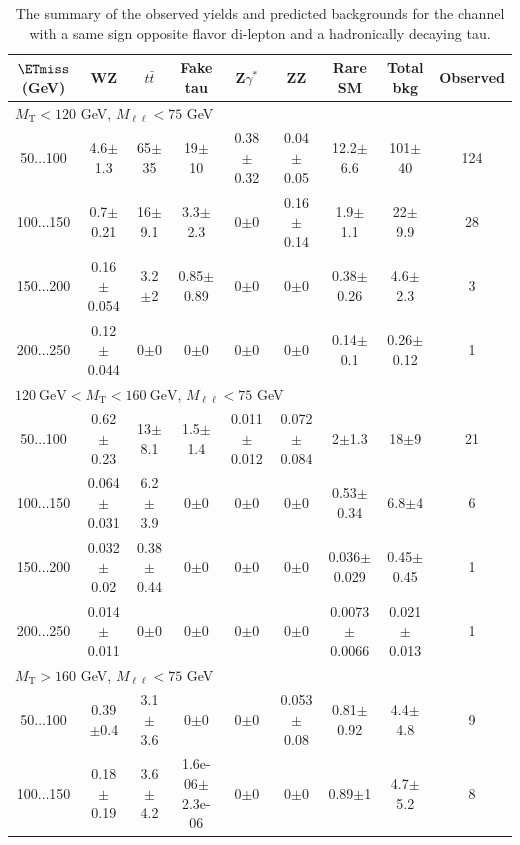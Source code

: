 \begin{landscape}
\begin{table}
\end{table}
\begin{table}
\small
\begin{center}
\caption{\label{tab:SSOStau1} The summary of the observed yields and predicted backgrounds for the channel with a same sign opposite flavor di-lepton and a hadronically decaying tau. }
\begin{tabular}{| c | c c c c c c  | c  c | }\hline\hline
$\ETmiss$ (GeV) & WZ & $t\bar{t}$ & Fake tau & Z$\gamma^*$ & ZZ & Rare SM & Total bkg & Observed\\\hline\hline
\multicolumn{8}{l}{$M_{\text{T}} < 120$ GeV, $M_{\ell\ell} < 75$ GeV}\\\hline\hline
50$\dots$100&4.6$\pm$1.3&65$\pm$35&19$\pm$10&0.38$\pm$0.32&0.04$\pm$0.05&12.2$\pm$6.6&101$\pm$40&124\\
100$\dots$150&0.7$\pm$0.21&16$\pm$9.1&3.3$\pm$2.3&0$\pm$0&0.16$\pm$0.14&1.9$\pm$1.1&22$\pm$9.9&28\\
150$\dots$200&0.16$\pm$0.054&3.2$\pm$2&0.85$\pm$0.89&0$\pm$0&0$\pm$0&0.38$\pm$0.26&4.6$\pm$2.3&3\\
200$\dots$250&0.12$\pm$0.044&0$\pm$0&0$\pm$0&0$\pm$0&0$\pm$0&0.14$\pm$0.1&0.26$\pm$0.12&1\\
\hline\hline
\multicolumn{8}{l}{$120~\mathrm{GeV} < M_{\text{T}} < 160~\mathrm{GeV}$, $M_{\ell\ell} < 75$ GeV}\\\hline\hline
50$\dots$100&0.62$\pm$0.23&13$\pm$8.1&1.5$\pm$1.4&0.011$\pm$0.012&0.072$\pm$0.084&2$\pm$1.3&18$\pm$9&21\\
100$\dots$150&0.064$\pm$0.031&6.2$\pm$3.9&0$\pm$0&0$\pm$0&0$\pm$0&0.53$\pm$0.34&6.8$\pm$4&6\\
150$\dots$200&0.032$\pm$0.02&0.38$\pm$0.44&0$\pm$0&0$\pm$0&0$\pm$0&0.036$\pm$0.029&0.45$\pm$0.45&1\\
200$\dots$250&0.014$\pm$0.011&0$\pm$0&0$\pm$0&0$\pm$0&0$\pm$0&0.0073$\pm$0.0066&0.021$\pm$0.013&1\\
\hline\hline
\multicolumn{8}{l}{$M_{\text{T}} > 160$ GeV, $M_{\ell\ell} < 75$ GeV}\\\hline\hline
50$\dots$100&0.39$\pm$0.4&3.1$\pm$3.6&0$\pm$0&0$\pm$0&0.053$\pm$0.08&0.81$\pm$0.92&4.4$\pm$4.8&9\\
100$\dots$150&0.18$\pm$0.19&3.6$\pm$4.2&1.6e-06$\pm$2.3e-06&0$\pm$0&0$\pm$0&0.89$\pm$1&4.7$\pm$5.2&8\\

\end{tabular}
\end{center}
\end{table}
\end{landscape}
